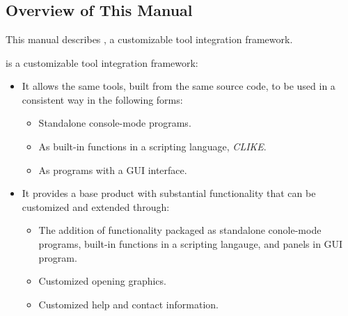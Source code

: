 \chapter{\cinttwotitle{}}

\label{cint2}


\section{Overview of This Manual}
\label{cint2:siov0}

This manual describes \emph{\productname{}}, a customizable tool integration
framework.

\emph{\productname{}} is a customizable tool integration framework:
\begin{itemize}
      \item It allows the same tools, built from the same source code,
            to be used in a consistent way in the following forms:
            \begin{itemize}
                  \item Standalone console-mode programs.
                  \item As built-in functions in a scripting language, \emph{CLIKE}.
                  \item As programs with a GUI interface.
            \end{itemize}
      \item It provides a base product with substantial functionality that can be
            customized and extended through:
            \begin{itemize}
                \item The addition of functionality packaged as standalone conole-mode programs,
                      built-in functions in a scripting langauge, and panels in GUI
                      program.
                \item Customized opening graphics.
                \item Customized help and contact information.
          \end{itemize}
\end{itemize}


